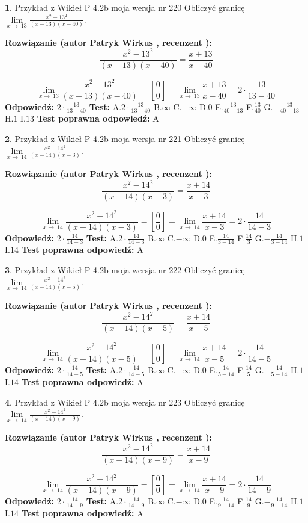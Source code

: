 \documentclass[12pt, a4paper]{article}
\theoremstyle{definition} %
\newtheorem{zad}{}
\newcommand{\zadStart}[1]{\begin{zad}#1\newline}
\newcommand{\zadStop}{\end{zad}}
\newcommand{\rozwStart}[2]{\noindent \textbf{Rozwiązanie (autor #1 , recenzent #2): }\newline}
\newcommand{\rozwStop}{\newline}
\newcommand{\odpStart}{\noindent \textbf{Odpowiedź:}\newline}
\newcommand{\odpStop}{\newline}
\newcommand{\testStart}{\noindent \textbf{Test:}\newline}
\newcommand{\testStop}{\newline}
\newcommand{\kluczStart}{\noindent \textbf{Test poprawna odpowiedź:}\newline}
\newcommand{\kluczStop}{\newline}
\begin{document}
\zadStart{Przykład z Wikieł P 4.2b moja wersja nr 220}
Obliczyć granicę $\lim\limits_{x\to\ 13}\frac{x^{2}-13^{2}}{(x-13)(x-40)}$.
\zadStop
\rozwStart{Patryk Wirkus}{}
$$\frac{x^{2}-13^{2}}{(x-13)(x-40)}=\frac{x+13}{x-40}$$

$$\lim\limits_{x\to\ 13}\frac{x^{2}-13^{2}}{(x-13)(x-40)}=[\frac{0}{0}]=\lim\limits_{x\to\ 13}\frac{x+13}{x-40}=2 \cdot \frac{13}{13-40}$$
\rozwStop
\odpStart
$2 \cdot \frac{13}{13-40}$
\odpStop
\testStart
A.$2 \cdot \frac{13}{13-40}$
B.$\infty$
C.$-\infty$
D.$0$
E.$\frac{13}{40-13}$
F.$\frac{13}{40}$
G.$-\frac{13}{40-13}$
H.$1$
I.$13$
\testStop
\kluczStart
A
\kluczStop



\zadStart{Przykład z Wikieł P 4.2b moja wersja nr 221}
Obliczyć granicę $\lim\limits_{x\to\ 14}\frac{x^{2}-14^{2}}{(x-14)(x-3)}$.
\zadStop
\rozwStart{Patryk Wirkus}{}
$$\frac{x^{2}-14^{2}}{(x-14)(x-3)}=\frac{x+14}{x-3}$$

$$\lim\limits_{x\to\ 14}\frac{x^{2}-14^{2}}{(x-14)(x-3)}=[\frac{0}{0}]=\lim\limits_{x\to\ 14}\frac{x+14}{x-3}=2 \cdot \frac{14}{14-3}$$
\rozwStop
\odpStart
$2 \cdot \frac{14}{14-3}$
\odpStop
\testStart
A.$2 \cdot \frac{14}{14-3}$
B.$\infty$
C.$-\infty$
D.$0$
E.$\frac{14}{3-14}$
F.$\frac{14}{3}$
G.$-\frac{14}{3-14}$
H.$1$
I.$14$
\testStop
\kluczStart
A
\kluczStop



\zadStart{Przykład z Wikieł P 4.2b moja wersja nr 222}
Obliczyć granicę $\lim\limits_{x\to\ 14}\frac{x^{2}-14^{2}}{(x-14)(x-5)}$.
\zadStop
\rozwStart{Patryk Wirkus}{}
$$\frac{x^{2}-14^{2}}{(x-14)(x-5)}=\frac{x+14}{x-5}$$

$$\lim\limits_{x\to\ 14}\frac{x^{2}-14^{2}}{(x-14)(x-5)}=[\frac{0}{0}]=\lim\limits_{x\to\ 14}\frac{x+14}{x-5}=2 \cdot \frac{14}{14-5}$$
\rozwStop
\odpStart
$2 \cdot \frac{14}{14-5}$
\odpStop
\testStart
A.$2 \cdot \frac{14}{14-5}$
B.$\infty$
C.$-\infty$
D.$0$
E.$\frac{14}{5-14}$
F.$\frac{14}{5}$
G.$-\frac{14}{5-14}$
H.$1$
I.$14$
\testStop
\kluczStart
A
\kluczStop



\zadStart{Przykład z Wikieł P 4.2b moja wersja nr 223}
Obliczyć granicę $\lim\limits_{x\to\ 14}\frac{x^{2}-14^{2}}{(x-14)(x-9)}$.
\zadStop
\rozwStart{Patryk Wirkus}{}
$$\frac{x^{2}-14^{2}}{(x-14)(x-9)}=\frac{x+14}{x-9}$$

$$\lim\limits_{x\to\ 14}\frac{x^{2}-14^{2}}{(x-14)(x-9)}=[\frac{0}{0}]=\lim\limits_{x\to\ 14}\frac{x+14}{x-9}=2 \cdot \frac{14}{14-9}$$
\rozwStop
\odpStart
$2 \cdot \frac{14}{14-9}$
\odpStop
\testStart
A.$2 \cdot \frac{14}{14-9}$
B.$\infty$
C.$-\infty$
D.$0$
E.$\frac{14}{9-14}$
F.$\frac{14}{9}$
G.$-\frac{14}{9-14}$
H.$1$
I.$14$
\testStop
\kluczStart
A
\kluczStop
\end{document}

